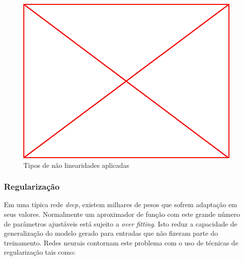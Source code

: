 \begin{figure}
  \caption{Tipos de não linearidades aplicadas}
  \begin{center}
    \includegraphics[scale=0.5]{placeholder}
  \end{center}
\end{figure}

\subsubsection{Regularização}

Em uma típica rede \emph{deep}, existem milhares de pesos que sofrem adaptação
em seus valores. Normalmente um aproximador de função com este grande número de
parâmetros ajustáveis está sujeito a \emph{over fitting}. Isto reduz a
capacidade de generalização do modelo gerado para entradas que não fizeram
parte do treinamento. Redes neurais contornam este problema com o uso de
técnicas de regularização tais como:

